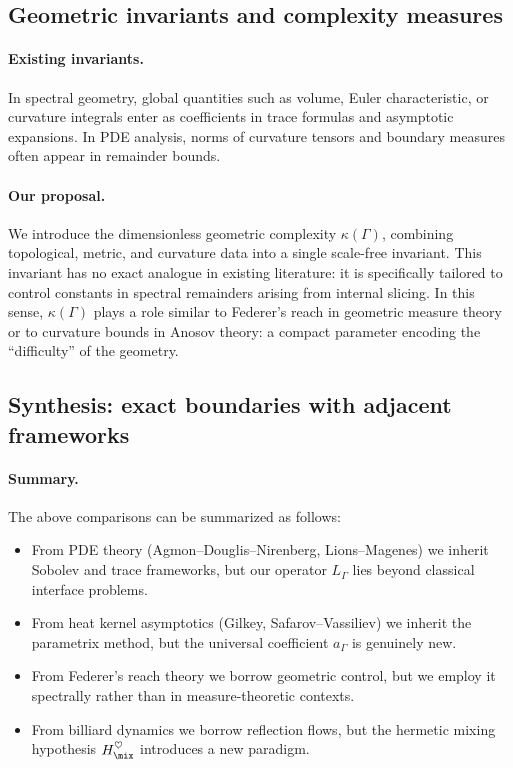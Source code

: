 \subsection{Geometric invariants and complexity measures}

\paragraph{Existing invariants.}
In spectral geometry, global quantities such as volume, Euler characteristic, or curvature integrals 
enter as coefficients in trace formulas and asymptotic expansions. 
In PDE analysis, norms of curvature tensors and boundary measures often appear in remainder bounds. 

\paragraph{Our proposal.}
We introduce the dimensionless geometric complexity $\kappa(\Gamma)$, 
combining topological, metric, and curvature data into a single scale-free invariant. 
This invariant has no exact analogue in existing literature: 
it is specifically tailored to control constants in spectral remainders arising from internal slicing. 
In this sense, $\kappa(\Gamma)$ plays a role similar to Federer’s reach in geometric measure theory 
or to curvature bounds in Anosov theory: a compact parameter encoding the ``difficulty'' of the geometry. 

\subsection{Synthesis: exact boundaries with adjacent frameworks}

\paragraph{Summary.}
The above comparisons can be summarized as follows:
\begin{itemize}
  \item From PDE theory (Agmon--Douglis--Nirenberg, Lions--Magenes) 
  we inherit Sobolev and trace frameworks, but our operator $L_\Gamma$ lies beyond classical interface problems. 
  \item From heat kernel asymptotics (Gilkey, Safarov--Vassiliev) 
  we inherit the parametrix method, but the universal coefficient $a_\Gamma$ is genuinely new. 
  \item From Federer’s reach theory we borrow geometric control, but we employ it spectrally rather than in measure-theoretic contexts. 
  \item From billiard dynamics we borrow reflection flows, but the hermetic mixing hypothesis $H_{\mix}^\heartsuit$ introduces a new paradigm. 
\end{itemize}

